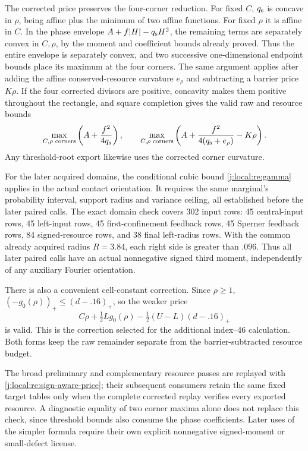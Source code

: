 The corrected price preserves the four-corner reduction. For fixed $C$,
$q_{\rm s}$ is concave in $\rho$, being affine plus the minimum of two
affine functions. For fixed $\rho$ it is affine in $C$. In the phase
envelope $A+f|H|-q_{\rm s}H^2$, the remaining terms are separately
convex in $C,\rho$, by the moment and coefficient bounds already proved.
Thus the entire envelope is separately convex, and two successive
one-dimensional endpoint bounds place its maximum at the four corners.
The same argument applies after adding the affine conserved-resource
curvature $e_\rho$ and subtracting a barrier price $K\rho$.
If the four corrected divisors are positive, concavity makes them
positive throughout the rectangle, and square completion gives the
valid raw and resource bounds
\[
 \max_{C,\rho\text{ corners}}\left(A+\frac{f^2}{4q_{\rm s}}\right),
 \qquad
 \max_{C,\rho\text{ corners}}
       \left(A+\frac{f^2}{4(q_{\rm s}+e_\rho)}-K\rho\right).
\]
Any threshold-root export likewise uses the corrected corner curvature.

For the later acquired domains, the conditional cubic bound
\eqref{j:local:re:gamma} applies in the actual contact orientation.
It requires the same marginal's probability interval, support radius
and variance ceiling, all established before the later paired calls.
The exact domain check covers 302 input rows: 45 central-input rows,
45 left-input rows, 45 first-confinement feedback rows, 45 Sperner feedback
rows, 84 signed-resource rows, and 38 final left-radius rows. With the
common already acquired radius $R=3.84$, each right side is greater than
$.096$. Thus all later paired calls have an actual nonnegative signed
third moment, independently of any auxiliary Fourier orientation.

There is also a convenient cell-constant correction. Since $\rho\ge1$,
$(-g_0(\rho))_+\le(d-.16)_+$, so the weaker price
\[
 C\rho+\tfrac12L g_0(\rho)
       -\tfrac12(U-L)(d-.16)_+
\]
is valid. This is the correction selected for the additional index--46
calculation. Both forms keep the raw remainder separate from the
barrier-subtracted resource budget.

The broad preliminary and complementary resource passes are replayed with
\eqref{j:local:re:sign-aware-price}; their subsequent consumers retain the same
fixed target tables only when the complete corrected replay verifies every
exported resource. A diagnostic equality of two corner maxima alone does
not replace this check, since threshold bounds also consume the phase
coefficients. Later uses of the simpler formula require their own explicit
nonnegative signed-moment or small-defect license.




